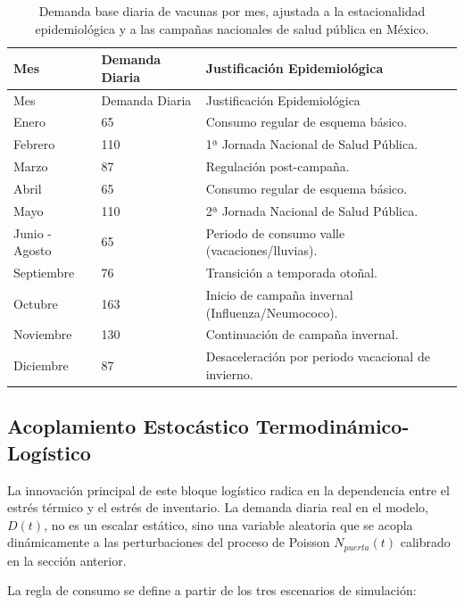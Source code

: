 \documentclass[
  spanish,
  us-letterpaper,
]{scrreprt}
\numberwithin{equation}{section}
\theoremstyle{plain}
\theoremstyle{plain}
\theoremstyle{definition}
\theoremstyle{plain}
\theoremstyle{remark}
\begin{document}
\begin{longtable}[]{@{}lll@{}}
\caption{Demanda base diaria de vacunas por mes, ajustada a la
estacionalidad epidemiológica y a las campañas nacionales de salud
pública en México.}\label{tbl-demanda-base}\tabularnewline
\toprule\noalign{}
Mes & Demanda Diaria & Justificación Epidemiológica \\
\midrule\noalign{}
\endfirsthead
\toprule\noalign{}
Mes & Demanda Diaria & Justificación Epidemiológica \\
\midrule\noalign{}
\endhead
\bottomrule\noalign{}
\endlastfoot
Enero & 65 & Consumo regular de esquema básico. \\
Febrero & 110 & 1ª Jornada Nacional de Salud Pública. \\
Marzo & 87 & Regulación post-campaña. \\
Abril & 65 & Consumo regular de esquema básico. \\
Mayo & 110 & 2ª Jornada Nacional de Salud Pública. \\
Junio - Agosto & 65 & Periodo de consumo valle (vacaciones/lluvias). \\
Septiembre & 76 & Transición a temporada otoñal. \\
Octubre & 163 & Inicio de campaña invernal (Influenza/Neumococo). \\
Noviembre & 130 & Continuación de campaña invernal. \\
Diciembre & 87 & Desaceleración por periodo vacacional de invierno. \\
\end{longtable}

\subsection{Acoplamiento Estocástico
Termodinámico-Logístico}\label{acoplamiento-estocuxe1stico-termodinuxe1mico-loguxedstico}

La innovación principal de este bloque logístico radica en la
dependencia entre el estrés térmico y el estrés de inventario. La
demanda diaria real en el modelo, \(D(t)\), no es un escalar estático,
sino una variable aleatoria que se acopla dinámicamente a las
perturbaciones del proceso de Poisson \(N_{puerta}(t)\) calibrado en la
sección anterior.

La regla de consumo se define a partir de los tres escenarios de
simulación:
\end{document}
